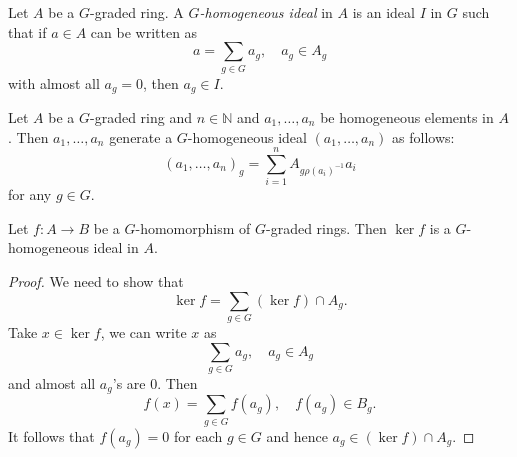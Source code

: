 \begin{definition}
    Let $A$ be a $G$-graded ring. A \emph{$G$-homogeneous ideal} in $A$ is an ideal $I$ in $G$ such that if $a\in A$ can be written as 
    \[
        a=\sum_{g\in G} a_g,\quad a_g\in A_g  
    \]
    with almost all $a_g=0$, then $a_g\in I$.
\end{definition}
\begin{example}\label{ex-homogeneousidealgeneratedbyelements}
    Let $A$ be a $G$-graded ring and $n\in \mathbb{N}$ and $a_1,\ldots,a_n$ be homogeneous elements in $A$. Then $a_1,\ldots,a_n$ generate a $G$-homogeneous ideal $(a_1,\ldots,a_n)$ as follows:
    \[
        (a_1,\ldots,a_n)_g=\sum_{i=1}^n A_{g \rho(a_i)^{-1}}a_i
    \]
    for any $g\in G$.
\end{example}


\begin{lemma}\label{lma-kernelghomogeneous}
    Let $f:A\rightarrow B$ be a $G$-homomorphism of $G$-graded rings. Then $\ker f$ is a $G$-homogeneous ideal in $A$.
\end{lemma}
\begin{proof}
    We need to show that
    \[
        \ker f=\sum_{g\in G} (\ker f)\cap A_g.  
    \]
    Take $x\in \ker f$, we can write $x$ as 
    \[
        \sum_{g\in G} a_g,\quad a_g\in A_g
    \]
    and almost all $a_g$'s are $0$. Then 
    \[
        f(x)=  \sum_{g\in G} f(a_g),\quad f(a_g)\in B_g.
    \]
    It follows that $f(a_g)=0$ for each $g\in G$ and hence $a_g\in (\ker f)\cap A_g$.
\end{proof}

